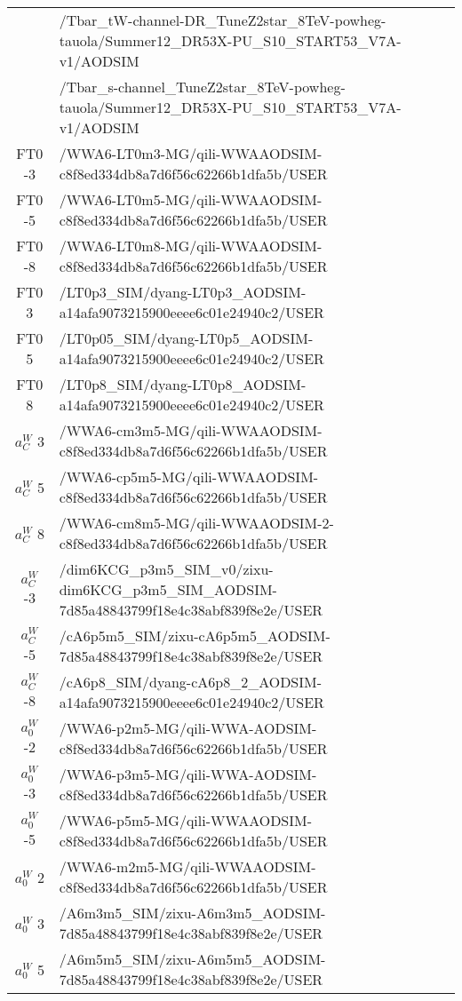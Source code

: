 \begin{sidewaystable}[htb]
\begin{center}
{\begin{tabular}{|c|l|}
      &/Tbar\_tW-channel-DR\_TuneZ2star\_8TeV-powheg-tauola/Summer12\_DR53X-PU\_S10\_START53\_V7A-v1/AODSIM \\
      &/Tbar\_s-channel\_TuneZ2star\_8TeV-powheg-tauola/Summer12\_DR53X-PU\_S10\_START53\_V7A-v1/AODSIM \\
      \hline
      FT0 -3& /WWA6-LT0m3-MG/qili-WWAAODSIM-c8f8ed334db8a7d6f56c62266b1dfa5b/USER  \\
      FT0 -5& /WWA6-LT0m5-MG/qili-WWAAODSIM-c8f8ed334db8a7d6f56c62266b1dfa5b/USER \\
      FT0 -8& /WWA6-LT0m8-MG/qili-WWAAODSIM-c8f8ed334db8a7d6f56c62266b1dfa5b/USER \\
      FT0 3& /LT0p3\_SIM/dyang-LT0p3\_AODSIM-a14afa9073215900eeee6c01e24940c2/USER \\
      FT0 5& /LT0p05\_SIM/dyang-LT0p5\_AODSIM-a14afa9073215900eeee6c01e24940c2/USER \\
      FT0 8& /LT0p8\_SIM/dyang-LT0p8\_AODSIM-a14afa9073215900eeee6c01e24940c2/USER \\
      \hline
      $a_{C}^{W}$ 3& /WWA6-cm3m5-MG/qili-WWAAODSIM-c8f8ed334db8a7d6f56c62266b1dfa5b/USER \\
      $a_{C}^{W}$ 5& /WWA6-cp5m5-MG/qili-WWAAODSIM-c8f8ed334db8a7d6f56c62266b1dfa5b/USER \\
      $a_{C}^{W}$ 8& /WWA6-cm8m5-MG/qili-WWAAODSIM-2-c8f8ed334db8a7d6f56c62266b1dfa5b/USER \\
      $a_{C}^{W}$ -3& /dim6KCG\_p3m5\_SIM\_v0/zixu-dim6KCG\_p3m5\_SIM\_AODSIM-7d85a48843799f18e4c38abf839f8e2e/USER \\
      $a_{C}^{W}$ -5& /cA6p5m5\_SIM/zixu-cA6p5m5\_AODSIM-7d85a48843799f18e4c38abf839f8e2e/USER \\
      $a_{C}^{W}$ -8& /cA6p8\_SIM/dyang-cA6p8\_2\_AODSIM-a14afa9073215900eeee6c01e24940c2/USER \\
      \hline
      $a_{0}^{W}$ -2&  /WWA6-p2m5-MG/qili-WWA-AODSIM-c8f8ed334db8a7d6f56c62266b1dfa5b/USER \\
      $a_{0}^{W}$ -3&  /WWA6-p3m5-MG/qili-WWA-AODSIM-c8f8ed334db8a7d6f56c62266b1dfa5b/USER \\
      $a_{0}^{W}$ -5&  /WWA6-p5m5-MG/qili-WWAAODSIM-c8f8ed334db8a7d6f56c62266b1dfa5b/USER \\
      $a_{0}^{W}$ 2&  /WWA6-m2m5-MG/qili-WWAAODSIM-c8f8ed334db8a7d6f56c62266b1dfa5b/USER \\
      $a_{0}^{W}$ 3&  /A6m3m5\_SIM/zixu-A6m3m5\_AODSIM-7d85a48843799f18e4c38abf839f8e2e/USER \\
      $a_{0}^{W}$ 5&  /A6m5m5\_SIM/zixu-A6m5m5\_AODSIM-7d85a48843799f18e4c38abf839f8e2e/USER \\

\end{tabular}}
\end{center}
\end{sidewaystable}
